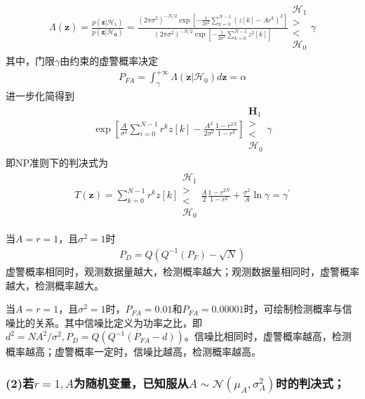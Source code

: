 \documentclass[fontset=windows]{article}
\numberwithin{figure}{section}
\begin{document}
\begin{align*}
	\Lambda(\mathbf{z})=\frac{p(\mathbf{z}|\mathcal{H}_1)}{p(\mathbf{z|\mathcal{H}_0})}
	=\frac{(2\pi \sigma^2)^{-N/2}\exp\left[-\frac{1}{2\sigma^2}\sum_{k=0}^{N-1}(z[k]-Ar^k)^2\right]}
	{(2\pi \sigma^2)^{-N/2}\exp\left[-\frac{1}{2\sigma^2}\sum_{k=0}^{N-1}z^2[k]\right]}
	\begin{matrix}
		\mathcal{H}_1 \\>\\<\\\mathcal{H}_0
	\end{matrix}\gamma
\end{align*}
其中，门限\(\gamma\)由约束的虚警概率决定
\begin{align*}
	P_{FA}=\int_{\gamma}^{+\infty}\Lambda(\mathbf{z}|\mathcal{H}_0)d\mathbf{z}=\alpha
\end{align*}
进一步化简得到
\begin{align*}
	\exp\left[\frac{A}{\sigma^2}\sum_{i=0}^{N-1}r^kz[k]-\frac{A^2}{2\sigma^2}\frac{1-r^{2N}}{1-r^2}\right]
	\begin{matrix}
		\mathbf{H}_1 \\>\\<\\\mathcal{H}_0
	\end{matrix}\gamma
\end{align*}
即NP准则下的判决式为
\begin{align*}
	T(\mathbf{z})=\sum_{k=0}^{N-1}r^kz[k]
	\begin{matrix}
		\mathcal{H}_1 \\>\\<\\\mathcal{H}_0
	\end{matrix}
	\frac{A}{2}\frac{1-r^{2N}}{1-r^2}+\frac{\sigma^2}{A}\ln \gamma
	=\gamma^{\prime}
\end{align*}

当\(A=r=1\)，且\(\sigma^2=1\)时
\begin{align*}
	P_D=Q(Q^{-1}(P_F)-\sqrt{N})
\end{align*}
虚警概率相同时，观测数据量越大，检测概率越大；观测数据量相同时，虚警概率越大，检测概率越大。

当\(A=r=1\)，且\(\sigma^2=1\)时，\(P_{FA}=0.01\)和\(P_{FA}=0.00001\)时，可绘制检测概率与信噪比的关系。其中信噪比定义为功率之比，即\(d^2=NA^2/\sigma^2,P_D=Q(Q^{-1}(P_{FA}-d))\)。信噪比相同时，虚警概率越高，检测概率越高；虚警概率一定时，信噪比越高，检测概率越高。

\subsubsection*{(2)若\(r=1,A\)为随机变量，已知服从\(A\sim \mathcal{N}(\mu_A,\sigma_A^2)\)时的判决式；}
\end{document}
